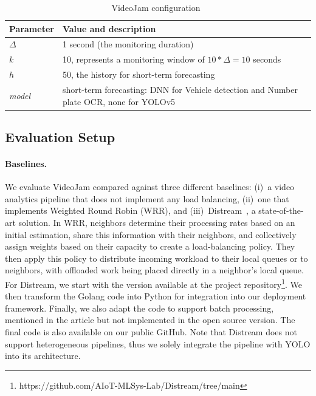 \begin{table}
	\centering
	\begin{tabular}{p{1.5cm}p{6.5cm}}
    \toprule
	\textbf{Parameter} & \textbf{Value and description}                                                          \\
	\midrule
	\textbf{$\Delta$}  & 1 second (the monitoring duration)                                                      \\
	\textbf{$k$}       & 10, represents a monitoring window of $10*\Delta=10$ seconds                            \\
	\textbf{$h$}       & 50, the history for short-term forecasting                                              \\
	\textit{model}     & short-term forecasting: DNN for Vehicle detection and Number plate OCR, none for YOLOv5 \\
	\bottomrule
	\end{tabular}
	\caption{VideoJam configuration~\label{tab:configuration}}
\end{table}

\subsection{Evaluation Setup}\label{sec:setup}

\paragraph{Baselines.} We evaluate VideoJam compared against three different baselines: (i)~a video analytics pipeline that does not implement any load balancing, (ii)~one that implements Weighted Round Robin (WRR), and (iii)~Distream~\cite{zeng2020distream}, a state-of-the-art solution. In WRR, neighbors determine their processing rates based on an initial estimation, share this information with their neighbors, and collectively assign weights based on their capacity to create a load-balancing policy. They then apply this policy to distribute incoming workload to their local queues or to neighbors, with offloaded work being placed directly in a neighbor's local queue. For Distream, we start with the version available at the project repository\footnote{https://github.com/AIoT-MLSys-Lab/Distream/tree/main}. We then transform the Golang code into Python for integration into our deployment framework. Finally, we also adapt the code to support batch processing, mentioned in the article but not implemented in the open source version. The final code is also available on our public GitHub. Note that Distream does not support heterogeneous pipelines, thus we solely integrate the pipeline with YOLO into its architecture.

